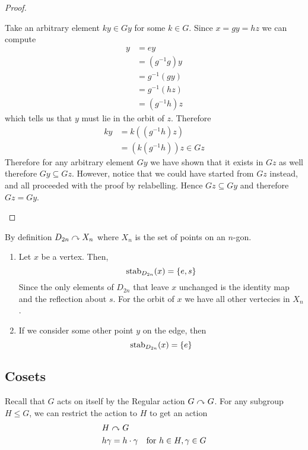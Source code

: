 \documentclass{article}
\begin{document}
\begin{proof}
\begin{enumerate}
        Take an arbitrary element $ky \in Gy$ for some $k \in G$. Since $x = gy = hz$ we can compute
        \begin{align*}
            y &= ey \\
            &= (g^{-1} g)y \\
            &= g^{-1} (gy) \\
            &= g^{-1} (hz) \\
            &= (g^{-1}h)z
        \end{align*}
        which tells us that $y$ must lie in the orbit of $z$. Therefore
        \begin{align*}
            ky &= k ((g^{-1}h)z) \\
            &= (k (g^{-1}h)) z \in Gz
        \end{align*}
        Therefore for any arbitrary element $Gy$ we have shown that it exists in $Gz$ as well therefore $Gy \subseteq Gz$. However, notice that we could have started from $Gz$ instead, and all proceeded with the proof by relabelling.
        Hence $Gz \subseteq Gy$ and therefore $Gz = Gy$.
    \end{enumerate}
\end{proof}

\begin{eg}
    By definition $D_{2n} \curvearrowright X_n$ where $X_n$ is the set of points on an $n$-gon. 
    \begin{enumerate}
        \item Let $x$ be a vertex. Then,
        \[
            \operatorname{stab}_{D_{2n}}(x) = \{e, s\}
        \]
        Since the only elements of $D_{2n}$ that leave $x$ unchanged is the identity map and the reflection about $s$. For the orbit of $x$ we have all other vertecies in $X_n$.
        \item If we consider some other point $y$ on the edge, then
        \[
            \operatorname{stab}_{D_{2n}}(x) = \{e\}
        \]
    \end{enumerate}
\end{eg}

\subsection{Cosets}

Recall that $G$ acts on itself by the Regular action $G \curvearrowright G$.
For any subgroup $H \leq G$, we can restrict the action to $H$ to get an action
\begin{align*}
    &H \curvearrowright G \\
    &h \gamma = h \cdot \gamma \quad  \text{for} \ h \in H, \gamma \in G\\
\end{align*}
\end{document}
